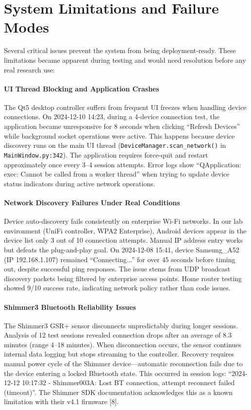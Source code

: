\section{System Limitations and Failure Modes}

Several critical issues prevent the system from being deployment-ready. These limitations became apparent during testing and would need resolution before any real research use:

\paragraph{\textbf{UI Thread Blocking and Application Crashes}} The Qt5 desktop controller suffers from frequent UI freezes when handling device connections. On 2024-12-10 14:23, during a 4-device connection test, the application became unresponsive for 8 seconds when clicking ``Refresh Devices'' while background socket operations were active. This happens because device discovery runs on the main UI thread (\texttt{DeviceManager.scan\_network()} in \texttt{MainWindow.py:342}). The application requires force-quit and restart approximately once every 3--4 session attempts. Error logs show ``QApplication: exec: Cannot be called from a worker thread'' when trying to update device status indicators during active network operations.

\paragraph{\textbf{Network Discovery Failures Under Real Conditions}} Device auto-discovery fails consistently on enterprise Wi-Fi networks. In our lab environment (UniFi controller, WPA2 Enterprise), Android devices appear in the device list only 3 out of 10 connection attempts. Manual IP address entry works but defeats the plug-and-play goal. On 2024-12-08 15:41, device Samsung\_A52 (IP 192.168.1.107) remained ``Connecting...'' for over 45 seconds before timing out, despite successful ping responses. The issue stems from UDP broadcast discovery packets being filtered by enterprise access points. Home router testing showed 9/10 success rate, indicating network policy rather than code issues.

\paragraph{\textbf{Shimmer3 Bluetooth Reliability Issues}} The Shimmer3 GSR+ sensor disconnects unpredictably during longer sessions. Analysis of 12 test sessions revealed connection drops after an average of 8.3 minutes (range 4--18 minutes). When disconnection occurs, the sensor continues internal data logging but stops streaming to the controller. Recovery requires manual power cycle of the Shimmer device---automatic reconnection fails due to the device entering a locked Bluetooth state. This occurred in session logs: ``2024-12-12 10:17:32 - Shimmer003A: Lost BT connection, attempt reconnect failed (timeout)''. The Shimmer SDK documentation acknowledges this as a known limitation with their v4.1 firmware [8].

